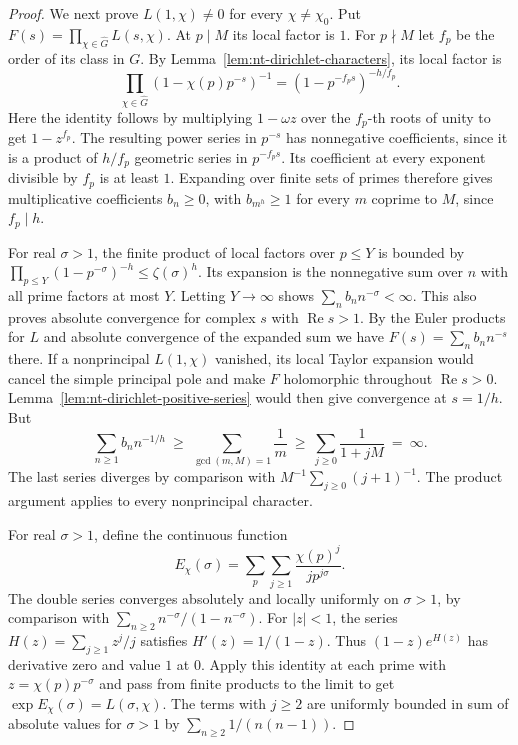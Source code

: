 \documentclass[11pt,oneside,openany]{book}
\theoremstyle{plain}
\theoremstyle{definition}
\theoremstyle{remark}
\begin{document}
\begin{proof}
We next prove \(L(1,\chi)\ne0\) for every \(\chi\ne\chi_0\).
Put \(F(s)=\prod_{\chi\in\widehat G}L(s,\chi)\).
At \(p\mid M\) its local factor is \(1\). For \(p\nmid M\) let
\(f_p\) be the order of its class in \(G\). By
Lemma~\ref{lem:nt-dirichlet-characters}, its local factor is
\[
 \prod_{\chi\in\widehat G}(1-\chi(p)p^{-s})^{-1}
     =(1-p^{-f_ps})^{-h/f_p}.
\]
Here the identity follows by multiplying \(1-\omega z\) over
the \(f_p\)-th roots of unity to get \(1-z^{f_p}\).
The resulting power series in \(p^{-s}\) has nonnegative
coefficients, since it is a product of \(h/f_p\) geometric
series in \(p^{-f_ps}\). Its coefficient at every exponent
divisible by \(f_p\) is at least \(1\). Expanding over finite
sets of primes therefore gives multiplicative coefficients
\(b_n\ge0\), with \(b_{m^h}\ge1\) for every \(m\) coprime to \(M\),
since \(f_p\mid h\).

For real \(\sigma>1\), the finite product of local factors
over \(p\le Y\) is bounded by
\(\prod_{p\le Y}(1-p^{-\sigma})^{-h}\le\zeta(\sigma)^h\).
Its expansion is the nonnegative sum over \(n\) with all
prime factors at most \(Y\). Letting \(Y\to\infty\) shows
\(\sum_n b_n n^{-\sigma}<\infty\). This also proves absolute
convergence for complex \(s\) with \(\operatorname{Re}s>1\).
By the Euler products for \(L\) and absolute convergence of the
expanded sum we have \(F(s)=\sum_n b_n n^{-s}\) there.
If a nonprincipal \(L(1,\chi)\) vanished, its local Taylor
expansion would cancel the simple principal pole and make
\(F\) holomorphic throughout \(\operatorname{Re}s>0\).
Lemma~\ref{lem:nt-dirichlet-positive-series} would then give
convergence at \(s=1/h\). But
\[
 \sum_{n\ge1}b_n n^{-1/h}
 \ \ge\ \sum_{\gcd(m,M)=1}\frac{1}{m}
 \ \ge\ \sum_{j\ge0}\frac{1}{1+jM}
 \ =\ \infty.
\]
The last series diverges by comparison with
\(M^{-1}\sum_{j\ge0}(j+1)^{-1}\). The product argument applies
to every nonprincipal character.

For real \(\sigma>1\), define the continuous function
\[
 E_\chi(\sigma)
  =\sum_p\sum_{j\ge1}\frac{\chi(p)^j}{j p^{j\sigma}}.
\]
The double series converges absolutely and locally uniformly
on \(\sigma>1\), by comparison with
\(\sum_{n\ge2}n^{-\sigma}/(1-n^{-\sigma})\).
For \(|z|<1\), the series \(H(z)=\sum_{j\ge1}z^j/j\) satisfies
\(H'(z)=1/(1-z)\). Thus \((1-z)e^{H(z)}\) has derivative zero
and value \(1\) at \(0\). Apply this identity at each prime
with \(z=\chi(p)p^{-\sigma}\) and pass from finite products
to the limit to get
\(\exp E_\chi(\sigma)=L(\sigma,\chi)\).
The terms with \(j\ge2\) are uniformly bounded in sum of absolute
values for \(\sigma>1\) by
\(\sum_{n\ge2}1/(n(n-1))\).


\end{proof}
\end{document}
